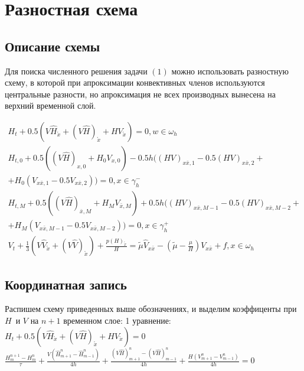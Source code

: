 \section{Разностная схема}
\subsection{Описание схемы}

Для поиска численного решения задачи $(1)$ можно использовать разностную схему, в которой при апроксимации конвективных членов используются центральные разности, но апроксимация не всех производных вынесена на верхний временной слой.

\begin{equation}
	\begin{array}{lc}
		H_t + 0.5(V\hat{H}_{\mathring{x}} + (V\hat{H})_{\mathring{x}} + HV_{\mathring{x}}) = 0, w \in \omega_h\\
		H_{t,0} + 0.5((V\hat{H})_{x,0} + H_0V_{x,0}) - 0.5h((HV)_{x\bar{x},1} - 0.5(HV)_{x\bar{x},2} + \\
		+ H_0(V_{x\bar{x},1} - 0.5 V_{x\bar{x},2})) = 0, x \in \gamma_h^-\\
		H_{t,M} + 0.5((V\hat{H})_{\bar{x},M} + H_MV_{\bar{x},M}) + 0.5h((HV)_{x\bar{x},M-1} - 0.5(HV)_{x\bar{x},M-2} + \\
		+ H_M(V_{x\bar{x},M-1} - 0.5 V_{x\bar{x},M-2})) = 0, x \in \gamma_h^+\\
		V_t + \frac{1}{3}(V\hat{V}_{\mathring{x}} + (V\hat{V})_{\mathring{x}}) + \frac{p(H)_{\mathring{x}}}{H} = \tilde{\mu}\hat{V}_{x\bar{x}} - \left(\tilde{\mu}-\frac{\mu}{H}\right)V_{x\bar{x}} + f, x \in \omega_h
	\end{array}
\end{equation}



\subsection{Координатная запись}
Распишем схему приведенных выше обозначениях, и выделим коэффиценты при $H\,$ и $V$ на $n + 1$ временном слое:
1 уравнение:\\

$
H_t + 0.5(V\hat{H}_{\mathring{x}} + (V\hat{H})_{\mathring{x}} + HV_{\mathring{x}}) = 0
$\\

$
\frac{H^{n+1}_m - H^n_m}{\tau} + \frac{V(\hat{H}_{m+1}^n - \hat{H}_{m-1}^n)}{4h} + \frac{(V\hat{H})^n_{m+1} - (V\hat{H})^n_{m-1}}{4h} + \frac{H(V^n_{m+1} - V^n_{m-1})}{4h} = 0
$

